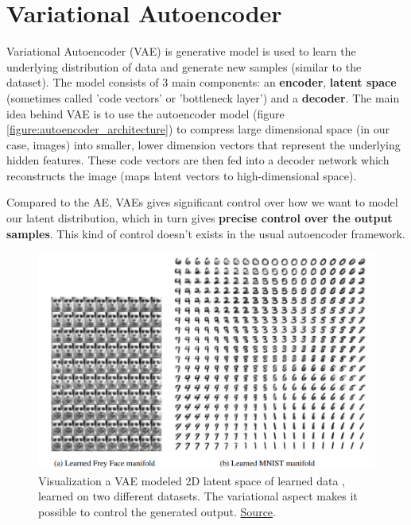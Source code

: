 \section{Variational Autoencoder}
\label{sec:vae}

Variational Autoencoder (VAE) \cite{vae} is generative model is used to learn the underlying distribution of data and generate new samples (similar to the dataset). The model consists of 3 main components: an \textbf{encoder}, \textbf{latent space} (sometimes called 'code vectors' or 'bottleneck layer') and a \textbf{decoder}. The main idea behind VAE is to use the autoencoder model \cite{autoencoder} \cite{autoencoder2} (figure \ref{figure:autoencoder_architecture}) to compress large dimensional space (in our case, images) into smaller, lower dimension vectors that represent the underlying hidden features. These code vectors are then fed into a decoder network which reconstructs the image (maps latent vectors to high-dimensional space).

Compared to the AE, VAEs gives significant control over how we want to model our latent distribution, which in turn gives \textbf{precise control over the output samples}. This kind of control doesn't exists in the usual autoencoder framework.



\begin{figure}
    \centering
    \includegraphics[scale=0.5]{images/vae.png}
    \caption{Visualization a VAE modeled 2D latent space of learned data \cite{vae}, learned on two different datasets. The variational aspect makes it possible to control the generated output. \href{https://ar5iv.labs.arxiv.org/html/1804.00140}{Source}.}
\end{figure}

